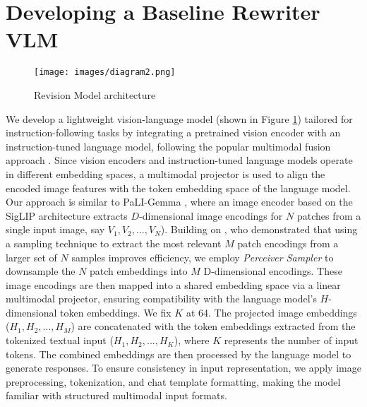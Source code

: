 \section{Developing a Baseline Rewriter VLM}
\label{sec:method}
\begin{figure}[t]
  \centering
  \texttt{[image: images/diagram2.png]}
  \caption{Revision Model architecture}
  \label{fig:diagram}
\end{figure}

We develop a lightweight vision-language model (shown in Figure \ref{fig:diagram}) tailored for instruction-following tasks by integrating a pretrained vision encoder with an instruction-tuned language model, following the popular multimodal fusion approach \cite{zhang2024vision}. Since vision encoders and instruction-tuned language models operate in different embedding spaces, a multimodal projector \cite{liu2023llava} is used to align the encoded image features with the token embedding space of the language model. Our approach is similar to PaLI-Gemma \cite{beyer2024paligemma}, where an image encoder based on the SigLIP architecture \cite{zhai2023sigmoid} extracts $D$-dimensional image encodings for $N$ patches from a single input image, say $V_1, V_2, ..., V_N$).  Building on , who demonstrated that using a sampling technique to extract the most relevant $M$ patch encodings from a larger set of $N$ samples improves efficiency, we employ \textit{Perceiver Sampler} \cite{jaegle2021perceiver} to downsample the $N$ patch embeddings into $M$ D-dimensional encodings. These image encodings are then mapped into a shared embedding space via a linear multimodal projector, ensuring compatibility with the language model’s $H$-dimensional token embeddings. We fix $K$ at 64. The projected image embeddings ($H_1, H_2, ..., H_M$) are concatenated with the token embeddings extracted from the tokenized textual input ($H_1, H_2, ..., H_K$), where $K$ represents the number of input tokens. The combined embeddings are then processed by the language model to generate responses. To ensure consistency in input representation, we apply image preprocessing, tokenization, and chat template formatting, making the model familiar with structured multimodal input formats. 

